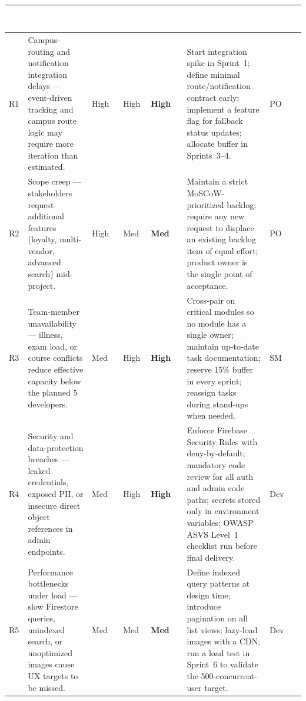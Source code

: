 \documentclass[11pt,a4paper]{article}
\begin{document}
\renewcommand{\arraystretch}{1.2}
\begin{table}[H]
\centering
\footnotesize
\begin{tabular}{|p{}|p{}|p{}|p{}|p{}|p{}|p{}|}
\hline
\rowcolor{aybuHeader}
\textcolor{white}{\textbf{ID}} &
\textcolor{white}{\textbf{Risk Description}} &
\textcolor{white}{\textbf{Prob.}} &
\textcolor{white}{\textbf{Imp.}} &
\textcolor{white}{\textbf{Expos.}} &
\textcolor{white}{\textbf{Mitigation Strategy}} &
\textcolor{white}{\textbf{Owner}} \\ \hline

R1 & Campus-routing and notification integration delays ---
event-driven tracking and campus route logic may require more iteration
than estimated. & High & High &
\cellcolor{riskHigh}\textbf{High} & Start integration spike in
Sprint~1; define minimal route/notification contract early; implement a
feature flag for fallback status updates; allocate buffer in
Sprints~3--4. & PO \\ \hline

R2 & Scope creep --- stakeholders request additional features
(loyalty, multi-vendor, advanced search) mid-project. & High & Med &
\cellcolor{riskMed}\textbf{Med} & Maintain a strict MoSCoW-prioritized
backlog; require any new request to displace an existing backlog item
of equal effort; product owner is the single point of acceptance. &
PO \\ \hline

R3 & Team-member unavailability --- illness, exam load, or course
conflicts reduce effective capacity below the planned 5 developers. &
Med & High & \cellcolor{riskHigh}\textbf{High} & Cross-pair on critical
modules so no module has a single owner; maintain up-to-date task
documentation; reserve 15\% buffer in every sprint; reassign tasks
during stand-ups when needed. & SM \\ \hline

R4 & Security and data-protection breaches --- leaked credentials,
exposed PII, or insecure direct object references in admin endpoints.
& Med & High & \cellcolor{riskHigh}\textbf{High} & Enforce Firebase
Security Rules with deny-by-default; mandatory code review for all
auth and admin code paths; secrets stored only in environment
variables; OWASP ASVS Level~1 checklist run before final delivery. &
Dev \\ \hline

R5 & Performance bottlenecks under load --- slow Firestore queries,
unindexed search, or unoptimized images cause UX targets to be missed.
& Med & Med & \cellcolor{riskMed}\textbf{Med} & Define indexed query
patterns at design time; introduce pagination on all list views;
lazy-load images with a CDN; run a load test in Sprint~6 to validate
the 500-concurrent-user target. & Dev \\ \hline


\end{tabular}
\end{table}
\end{document}
